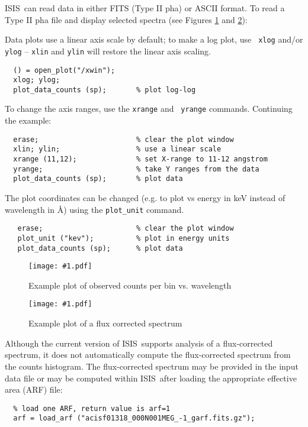 \documentclass{book}
\newcommand{\putfig}[1]{\texttt{[image: \#1.pdf]}}
\newcommand{\putfig}[1]{\psfig{file=#1.ps}}
\newcommand{\isisx}{{\sc ISIS~}}
\begin{document}
{\isisx can read data in either FITS (Type II pha) or ASCII format.
To read a Type II pha file and display selected spectra (see Figures
\ref{fig:data_cts} and \ref{fig:data_flx}):



Data plots use a linear axis scale by default; to make a log plot, use {\tt
xlog} and/or {\tt ylog} -- {\tt xlin} and {\tt ylin} will restore the linear
axis scaling.

\begin{verbatim}
  () = open_plot("/xwin");
  xlog; ylog;
  plot_data_counts (sp);       % plot log-log
\end{verbatim}

To change the axis ranges, use the {\tt xrange} and {\tt
yrange} commands.  Continuing the example:

\begin{verbatim}
  erase;                       % clear the plot window
  xlin; ylin;                  % use a linear scale
  xrange (11,12);              % set X-range to 11-12 angstrom
  yrange;                      % take Y ranges from the data
  plot_data_counts (sp);       % plot data
\end{verbatim}

The plot coordinates can be changed (e.g. to plot vs energy in keV
instead of wavelength in \AA) using the {\tt plot\_unit} command.

\begin{verbatim}
   erase;                      % clear the plot window
   plot_unit ("kev");          % plot in energy units
   plot_data_counts (sp);      % plot data
\end{verbatim}

\begin{figure}[ht]
\putfig{figures/data_cts}
\caption{Example plot of observed counts per bin vs. wavelength}
\label{fig:data_cts}
\end{figure}

\begin{figure}[ht]
\putfig{figures/data_flx}
\caption{Example plot of a flux corrected spectrum}
\label{fig:data_flx}
\end{figure}

Although the current version of \isisx supports analysis of a flux-corrected
spectrum, it does not automatically compute the flux-corrected spectrum from
the counts histogram. The flux-corrected spectrum may be provided in the
input data file or may be computed within \isisx after loading the
appropriate effective area (ARF) file:
\begin{verbatim}
  % load one ARF, return value is arf=1
  arf = load_arf ("acisf01318_000N001MEG_-1_garf.fits.gz");


\end{verbatim}}
\end{document}
